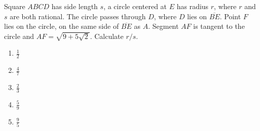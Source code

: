 Square $ABCD$ has side length $s$, a circle centered at $E$ has radius $r$, where $r$ and $s$ are both rational. The circle passes through $D$, where $D$ lies on $\overline{BE}$. Point $F$ lies on the circle, on the same side of $\overline{BE}$ as $A$. Segment $AF$ is tangent to the circle and $AF=\displaystyle\sqrt{9+5\sqrt{2}}$. Calculate $r/s$.

\begin{enumerate}
\item $\displaystyle\frac{1}{2}$
\item $\displaystyle\frac{4}{7}$
\item $\displaystyle\frac{2}{3}$
\item $\displaystyle\frac{5}{9}$
\item $\displaystyle\frac{9}{5}$
\end{enumerate}
